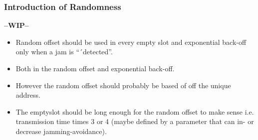 \subsubsection{Introduction of Randomness} %
\label{ssub:introduction_of_randomness}
\textbf{--WIP--}
\begin{itemize}
    \item Random offset should be used in every empty slot and exponential back-off only when a jam is ``´detected''.
    \item Both in the random offset and exponential back-off.
    \item However the random offset should probably be based of off the unique address.
    \item The emptyslot should be long enough for the random offset to make sense i.e. transmission time times 3 or 4 (maybe defined by a parameter that can in- or decrease jamming-avoidance).
\end{itemize}  


